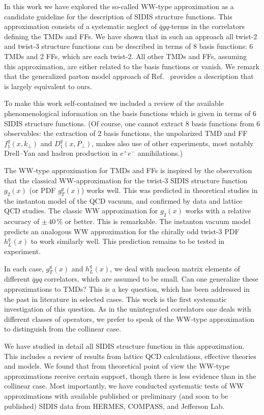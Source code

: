 \documentclass[a4paper,11pt]{article}
\def\kperp{k_\perp}
\def\pperp{P_\perp}
\begin{document}
In this work we have explored the so-called WW-type approximation
as a candidate guideline for the description of SIDIS structure
functions. This approximation consists of a systematic neglect 
of $\bar{q}gq$-terms in the
correlators defining the TMDs and FFs. We have shown that in such
an approach all twist-2 and twist-3 structure functions can be
described in terms of 8 basis functions: 6 TMDs and 2 FFs,
which are each twist-2. All other TMDs and FFs, assuming this
approximation, are either related to the basis functions or
vanish. 
We remark that the generalized parton model 
approach of Ref.~\cite{Anselmino:2011ch} provides a description
that is largely equivalent to ours. 

To make this work self-contained we included a review of the 
available phenomenological information on the basis functions 
which is given in terms of 6 SIDIS structure functions. 
(Of course, one cannot extract 8 basis
functions from 6 observables: the extraction of 2 basis functions,
the unpolarized TMD and FF $f_1^q(x,\kperp)$ and $D_1^q(x,\pperp)$,
makes also use of other experiments, most notably Drell--Yan
and hadron production in $e^+e^-$ annihilations.)

The WW-type approximation for TMDs and FFs is inspired by the
observation that the classical WW-approximation for the twist-3
SIDIS structure function $g_2(x)$ (or PDF $g_T^q(x)$) works well. 
This was predicted in theoretical studies in the instanton model 
of the QCD vacuum, and confirmed by data and lattice QCD studies.
The classic WW approximation for $g_2(x)$ works with a relative
accuracy of $\pm\,40\,\%$ or better. This is remarkable.
The instanton vacuum model predicts an analogous WW approximation
for the chirally odd twist-3 PDF $h_L^q(x)$ to work similarly
well. This prediction remains to be tested in experiment.

In each case, $g_T^q(x)$ and $h_L^q(x)$, we deal with nucleon
matrix elements of different $\bar{q}gq$ correlators, which are 
assumed to be small. Can one generalize these approximations to
TMDs? This is a key question, which has been addressed in the
past in literature in selected cases. This work is the first
systematic investigation of this question.
As in the unintegrated correlators one deals with different
classes of operators, we prefer to speak of the
WW-type approximation to distinguish from the collinear case.

We have studied in detail all SIDIS structure function in 
this approximation. This includes a review of results from 
lattice QCD calculations, effective theories and models.
We found that from theoretical point of view the WW-type
approximations receive certain support, though there is 
less evidence than in the collinear case.
Most importantly, we have conducted systematic tests of
WW approximations with available published or 
preliminary (and soon to be published) SIDIS data
from HERMES, COMPASS, and Jefferson Lab.
\end{document}
